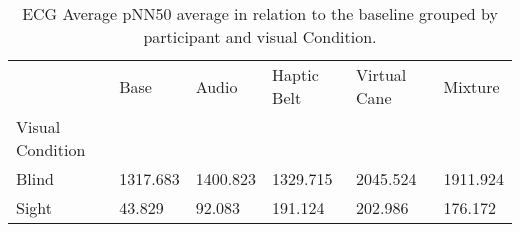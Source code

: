 
\begin{table}[!htb]
\centering
\caption{ECG Average pNN50 average in relation to the baseline grouped by participant and visual Condition.}
\label{tab:ecg_pnn50_average_group}
\begin{tabular}{llllll}
\toprule
{} &     Base &    Audio &  Haptic Belt &  Virtual Cane &  Mixture \\
Visual Condition &          &          &              &               &          \\
\midrule
Blind            & 1317.683 & 1400.823 &     1329.715 &      2045.524 & 1911.924 \\
Sight            &   43.829 &   92.083 &      191.124 &       202.986 &  176.172 \\
\bottomrule
\end{tabular}
\end{table}


